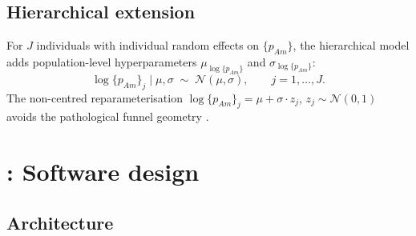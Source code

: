 \documentclass[article,shortnames]{jss}
\newcommand{\pAm}{\{p_{Am}\}}
\begin{document}
\subsection{Hierarchical extension}

For $J$ individuals with individual random effects on $\pAm$, the
hierarchical model adds population-level hyperparameters
$\mu_{\log \pAm}$ and $\sigma_{\log \pAm}$:
\begin{equation}
  \log \pAm_j \mid \mu, \sigma \;\sim\; \mathcal{N}(\mu, \sigma),
  \qquad j = 1, \ldots, J.
  \label{eq:hier_formal}
\end{equation}
The non-centred reparameterisation $\log \pAm_j = \mu + \sigma \cdot
z_j$, $z_j \sim \mathcal{N}(0,1)$ avoids the pathological funnel
geometry \citep{BetancourtHierarchical2015}.


\section[BayesianDEB: Software design]{%
  : Software design} \label{sec:design}

\subsection{Architecture} \label{sec:architecture}
\end{document}

